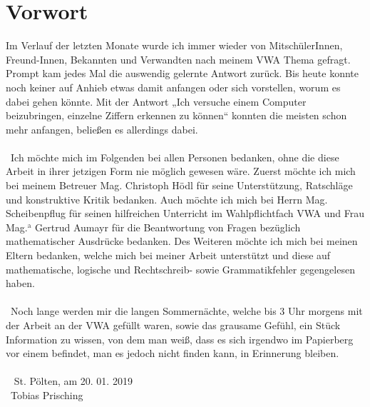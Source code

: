 \documentclass[
	a4paper,
	12pt,
	ngerman,
	oneside
]{scrreprt}											%
\begin{document}
	
	
	\chapter*{Vorwort}\label{Vorwort}
		Im Verlauf der letzten Monate wurde ich immer wieder von MitschülerInnen, Freund-Innen, Bekannten und Verwandten nach meinem VWA Thema gefragt. Prompt kam jedes Mal die auswendig gelernte Antwort zurück. Bis heute konnte noch keiner auf Anhieb etwas damit anfangen oder sich vorstellen, worum es dabei gehen könnte. Mit der Antwort „Ich versuche einem Computer beizubringen, einzelne Ziffern erkennen zu können“ konnten die meisten schon mehr anfangen, beließen es allerdings dabei. 
		\\ \
		\\ \
		Ich möchte mich im Folgenden bei allen Personen bedanken, ohne die diese Arbeit in ihrer jetzigen Form nie möglich gewesen wäre. Zuerst möchte ich mich bei meinem Betreuer Mag. Christoph Hödl für seine Unterstützung, Ratschläge und konstruktive Kritik bedanken. Auch möchte ich mich bei Herrn Mag. Scheibenpflug für seinen hilfreichen Unterricht im Wahlpflichtfach VWA und Frau Mag.$^{\textrm{a}}$ Gertrud Aumayr für die Beantwortung von Fragen bezüglich mathematischer Ausdrücke bedanken. Des Weiteren möchte ich mich bei meinen Eltern bedanken, welche mich bei meiner Arbeit unterstützt und diese auf mathematische, logische und Rechtschreib- sowie Grammatikfehler gegengelesen haben. 
		\\ \
		\\ \
		Noch lange werden mir die langen Sommernächte, welche bis 3 Uhr morgens mit der Arbeit an der VWA gefüllt waren, sowie das grausame Gefühl, ein Stück Information zu wissen, von dem man weiß, dass es sich irgendwo im Papierberg vor einem befindet, man es jedoch nicht finden kann, in Erinnerung bleiben. 
		\\ \ 
		\\ \
		St. Pölten, am 20. 01. 2019 \\ \
		Tobias Prisching
		\thispagestyle{empty}
		
		
	
	\begingroup
		\renewcommand*{\chapterpagestyle}{empty}
		\pagestyle{empty}
		\tableofcontents
		\clearpage
	\endgroup
	
\end{document}
